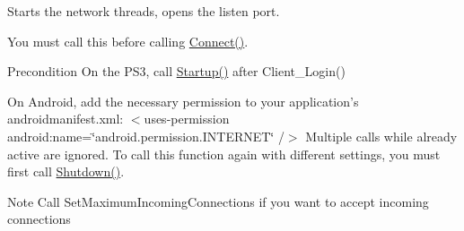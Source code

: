 Starts the network threads, opens the listen port. 

You must call this before calling \hyperlink{class_rak_net_1_1_rak_peer_interface_a451dd5d225277fe5806d3d700551fb76}{Connect()}. \begin{DoxyPrecond}{Precondition}
On the P\-S3, call \hyperlink{class_rak_net_1_1_rak_peer_interface_ad360d12ceb7d7448b598c451fffd2d9c}{Startup()} after Client\-\_\-\-Login() 

On Android, add the necessary permission to your application's androidmanifest.\-xml\-: $<$uses-\/permission android\-:name=\char`\"{}android.\-permission.\-I\-N\-T\-E\-R\-N\-E\-T\char`\"{} /$>$ Multiple calls while already active are ignored. To call this function again with different settings, you must first call \hyperlink{class_rak_net_1_1_rak_peer_interface_a4f4acefdc022555862fd386e31f9a22b}{Shutdown()}. 
\end{DoxyPrecond}
\begin{DoxyNote}{Note}
Call Set\-Maximum\-Incoming\-Connections if you want to accept incoming connections 
\end{DoxyNote}


